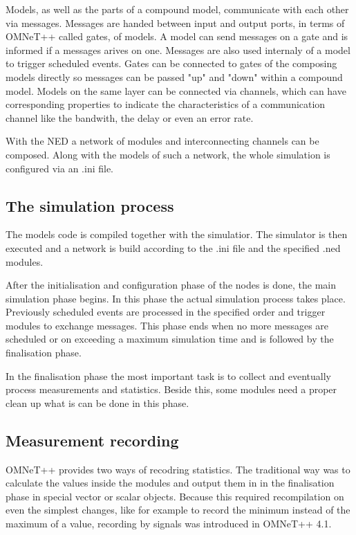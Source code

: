 Models, as well as the parts of a compound model, communicate with each other via messages. Messages are handed between input and output ports, in terms of OMNeT++ called gates, of models. A model can send messages on a gate and is informed if a messages arives on one. Messages are also used internaly of a model to trigger scheduled events. Gates can be connected to gates of the composing models directly so messages can be passed "up" and "down" within a compound model. Models on the same layer can be connected via channels, which can have corresponding properties to indicate the characteristics of a communication channel like the bandwith, the delay or even an error rate.

With the NED a network of modules and interconnecting channels can be composed. Along with the models of such a network, the whole simulation is configured via an .ini file.

\subsection{The simulation process}

The models code is compiled together with the simulatior. The simulator is then executed and a network is build according to the .ini file and the specified .ned modules.

After the initialisation and configuration phase of the nodes is done, the main simulation phase begins. In this phase the actual simulation process takes place. Previously scheduled events are processed in the specified order and trigger modules to exchange messages. This phase ends when no more messages are scheduled or on exceeding a maximum simulation time and is followed by the finalisation phase.

In the finalisation phase the most important task is to collect and eventually process measurements and statistics. Beside this, some modules need a proper clean up what is can be done in this phase.

\subsection{Measurement recording}

OMNeT++ provides two ways of recodring statistics. The traditional way was to calculate the values inside the modules and output them in in the finalisation phase in special vector or scalar objects. Because this required recompilation on even the simplest changes, like for example to record the minimum instead of the maximum of a value, recording by signals was introduced in OMNeT++ 4.1.

